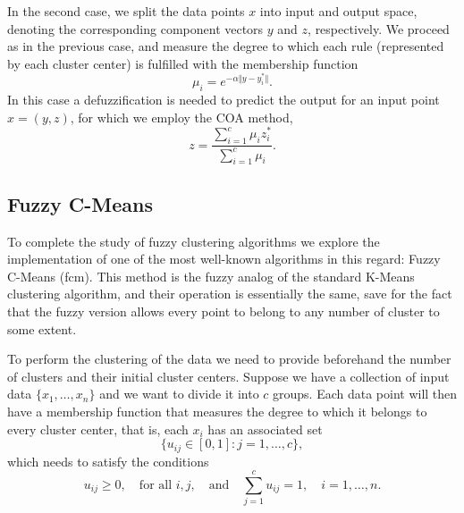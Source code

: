 In the second case, we split the data points $x$ into input and output space, denoting the corresponding component vectors $y$ and $z$, respectively. We proceed as in the previous case, and measure the degree to which each rule (represented by each cluster center) is fulfilled with the membership function
\[
\mu_i = e^{-\alpha \Vert y - y_i^\ast \Vert}.
\]
In this case a defuzzification is needed to predict the output for an input point $x=(y,z)$, for which we employ the COA method,
\[
z = \dfrac{\displaystyle \sum_{i=1}^c \mu_iz_i^\ast}{\displaystyle \sum_{i=1}^c \mu_i}.
\]

\subsection{Fuzzy C-Means}

To complete the study of fuzzy clustering algorithms we explore the implementation of one of the most well-known algorithms in this regard: Fuzzy C-Means (\acrshort{fcm}). This method is the fuzzy analog of the standard K-Means clustering algorithm, and their operation is essentially the same, save for the fact that the fuzzy version allows every point to belong to any number of cluster to some extent.

To perform the clustering of the data we need to provide beforehand the number of clusters and their initial cluster centers. Suppose we have a collection of input data $\{x_1,\dots,x_n\}$ and we want to divide it into $c$ groups. Each data point will then have a membership function that measures the degree to which it belongs to every cluster center, that is, each $x_i$ has an associated set
\[
\{u_{ij} \in [0,1]: j=1,\dots,c \},
\]
which needs to satisfy the conditions
\begin{equation} \label{eq:fcm-constraint}
u_{ij}\geq 0, \quad \text{for all } i,j, \quad \text{and} \quad \sum_{j=1}^c u_{ij} = 1, \quad i=1,\dots,n.
\end{equation}

